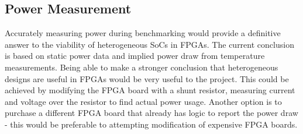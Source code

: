 \subsection{Power Measurement}
Accurately measuring power during benchmarking would provide a definitive answer to the viability of heterogeneous SoCs in FPGAs. The current conclusion is based on static power data and implied power draw from temperature measurements. Being able to make a stronger conclusion that heterogeneous designs are useful in FPGAs would be very useful to the project. This could be achieved by modifying the FPGA board with a shunt resistor, measuring current and voltage over the resistor to find actual power usage. Another option is to purchase a different FPGA board that already has logic to report the power draw - this would be preferable to attempting modification of expensive FPGA boards.